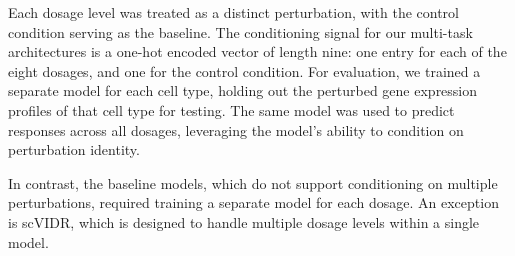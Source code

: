 \documentclass[12pt, a4paper]{article}
\begin{document}
Each dosage level was treated as a distinct perturbation, with the control condition serving as the baseline. The conditioning signal for our multi-task architectures is a one-hot encoded vector of length nine: one entry for each of the eight dosages, and one for the control condition. For evaluation, we trained a separate model for each cell type, holding out the perturbed gene expression profiles of that cell type for testing. The same model was used to predict responses across all dosages, leveraging the model's ability to condition on perturbation identity.

In contrast, the baseline models, which do not support conditioning on multiple perturbations, required training a separate model for each dosage. An exception is scVIDR, which is designed to handle multiple dosage levels within a single model.
\end{document}
